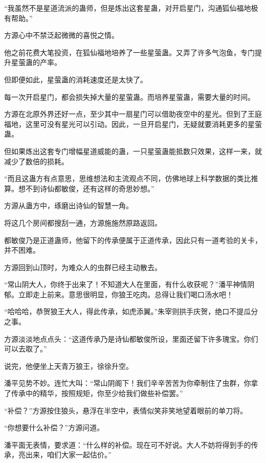 
\begin{this_body}

“我虽然不是星道流派的蛊师，但是炼出这套星蛊，对开启星门，沟通狐仙福地极有帮助。”

方源心中不禁泛起微微的喜悦之情。

他之前花费大笔投资，在狐仙福地培养了一些星萤蛊。又弄了许多气泡鱼，专门提升星萤蛊的产率。

但即便如此，星萤蛊的消耗速度还是太快了。

每一次开启星门，都会损失掉大量的星萤蛊。而培养星萤蛊，需要大量的时间。

方源在北原外界还好一点，至少其中一扇星门可以借助夜空中的星光。但到了王庭福地，这里可没有星光可以引动。因此，一旦开启星门，无疑就要消耗更多的星萤蛊。

但如果炼出这套专门增幅星道威能的蛊，一只星萤蛊能抵数只效果，这样一来，就减少了数倍的损耗。

“而且这蛊方有点意思，思维想法和主流观点不同，仿佛地球上科学数据的类比推算。想不到诗仙都敏俊，还有这样的奇思妙想。”

方源从蛊方中，琢磨出诗仙的智慧一角。

将这几个房间都搜刮一通，方源施施然原路返回。

都敏俊乃是正道蛊师，他留下的传承便属于正道传承，因此只有一道考验的关卡，并不困难。

方源回到山顶时，为难众人的虫群已经主动散去。

“常山阴大人，你终于出来了！不知道大人在里面，有什么收获呢？”潘平神情阴郁。立即走上前来。意思很明显，你狼王吃肉。总得让我们喝口汤水吧！

“哈哈哈，恭贺狼王大人，得此传承，如虎添翼。”朱宰则拱手庆贺，绝口不提瓜分之事。

方源淡淡地点点头：“这道传承乃是诗仙都敏俊所设，里面还留下许多瑰宝。你们可以去取了。”

说完，他便坐上天青万狼王，徐徐升空。

潘平见势不妙。连忙大叫：“常山阴阁下！我们辛辛苦苦为你牵制住了虫群，你拿了传承中的精华，按照规矩，你至少给我们做些补偿罢。”

“补偿？”方源按住狼头，悬浮在半空中，表情似笑非笑地望着眼前的单刀将。

“你想要什么补偿？”方源问道。

潘平面无表情，要求道：“什么样的补偿。现在可不好说。大人不妨将得到手的传承，亮出来，咱们大家一起估价。”


\end{this_body}
